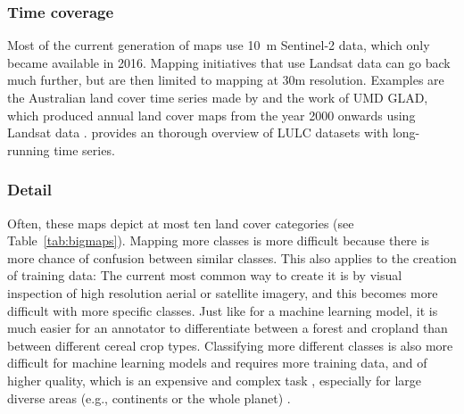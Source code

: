     \subsubsection{Time coverage} 
        Most of the current generation of maps use 10~m Sentinel-2 data, which only became available in 2016. Mapping initiatives that use Landsat data can go back much further, but are then limited to mapping at 30m resolution. Examples are the Australian land cover time series made by \citep{calderon2021high} and the work of UMD GLAD, which produced annual land cover maps from the year 2000 onwards using Landsat data \citep{hansen2022global}. \citet{garcia2022global} provides an thorough overview of LULC datasets with long-running time series.

    \subsubsection{Detail}
        Often, these maps depict at most ten land cover categories (see Table~\ref{tab:bigmaps}). Mapping more classes is more difficult because there is more chance of confusion between similar classes. This also applies to the creation of training data: The current most common way to create it is by visual inspection of high resolution aerial or satellite imagery, and this becomes more difficult with more specific classes. Just like for a machine learning model, it is much easier for an annotator to differentiate between a forest and cropland than between different cereal crop types. Classifying more different classes is also more difficult for machine learning models and requires more training data, and of higher quality, which is an expensive and complex task \citep{li2021improving}, especially for large diverse areas (e.g., continents or the whole planet) \citep{tsendbazar2021towards,stanimirova2023global}. 

